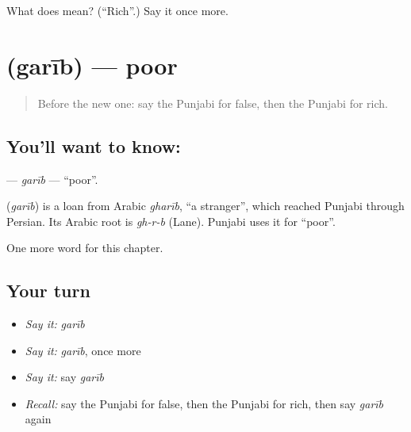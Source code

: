 \begin{tcolorbox}[breakable,colback=teal!4,colframe=teal!35!black,title={Before you move on}]
What does  mean? (\textquotedblleft{}Rich\textquotedblright{}.) Say it once more.
\end{tcolorbox}
\section[\texorpdfstring{\pa{ਗ਼ਰੀਬ} (garīb)}{ਗ਼ਰੀਬ (garīb)}]{ (garīb) — poor}

\label{lesson:PA-C147-garib}



\begin{quote}
Before the new one: say the Punjabi for false, then the Punjabi for rich.
\end{quote}

\subsection*{You'll want to know: }
\textbf{} — \emph{garīb} — \textquotedblleft{}poor\textquotedblright{}.

\begin{cousinweb}
\textbf{} (\emph{garīb}) is a loan from Arabic \emph{gharīb}, \textquotedblleft{}a stranger\textquotedblright{}, which reached Punjabi through Persian. Its Arabic root is \emph{gh-r-b} (Lane). Punjabi uses it for \textquotedblleft{}poor\textquotedblright{}.
\end{cousinweb}

\begin{grammarlens}[title={What you've built}]
One more word for this chapter.
\end{grammarlens}

\subsection*{Your turn}
\begin{itemize}
\raggedright
  \item \emph{Say it:} \emph{garīb}
  \item \emph{Say it:} \emph{garīb}, once more
  \item \emph{Say it:} say \emph{garīb}
  \item \emph{Recall:} say the Punjabi for false, then the Punjabi for rich, then say \emph{garīb} again
\end{itemize}

